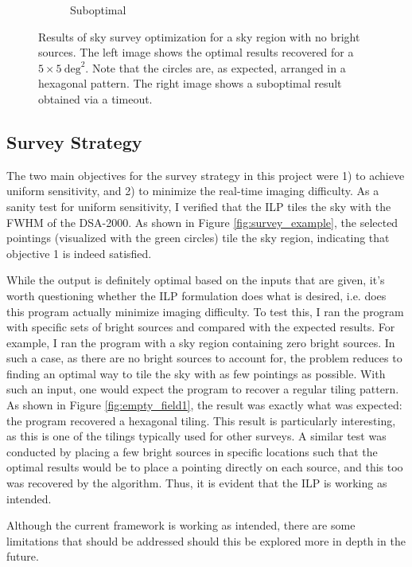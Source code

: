 \documentclass{article}
\begin{document}
\begin{multicols*}{2}
\begin{figure}
\begin{subfigure}{0.45\textwidth}
        \caption{Suboptimal}
        \label{fig:empty_field2}
    \end{subfigure}
    \caption{Results of sky survey optimization for a sky region with no bright sources. The left image shows the optimal results recovered for a $5\times 5\ \mbox{deg}^2$. Note that the circles are, as expected, arranged in a hexagonal pattern. The right image shows a suboptimal result obtained via a timeout.}
    \label{fig:empty_field}
\end{figure}

\subsection{Survey Strategy}
The two main objectives for the survey strategy in this project were 1) to achieve uniform sensitivity, and 2) to minimize the real-time imaging difficulty. As a sanity test for uniform sensitivity, I verified that the ILP tiles the sky with the FWHM of the DSA-2000. As shown in Figure \ref{fig:survey_example}, the selected pointings (visualized with the green circles) tile the sky region, indicating that objective 1 is indeed satisfied.

While the output is definitely optimal based on the inputs that are given, it's worth questioning whether the ILP formulation does what is desired, i.e. does this program actually minimize imaging difficulty. To test this, I ran the program with specific sets of bright sources and compared with the expected results. For example, I ran the program with a sky region containing zero bright sources. In such a case, as there are no bright sources to account for, the problem reduces to finding an optimal way to tile the sky with as few pointings as possible. With such an input, one would expect the program to recover a regular tiling pattern. As shown in Figure \ref{fig:empty_field1}, the result was exactly what was expected: the program recovered a hexagonal tiling. This result is particularly interesting, as this is one of the tilings typically used for other surveys. A similar test was conducted by placing a few bright sources in specific locations such that the optimal results would be to place a pointing directly on each source, and this too was recovered by the algorithm. Thus, it is evident that the ILP is working as intended.

Although the current framework is working as intended, there are some limitations that should be addressed should this be explored more in depth in the future.


\end{multicols*}
\end{document}

